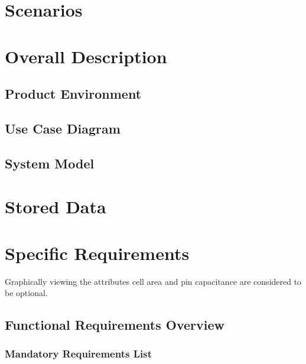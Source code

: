 \documentclass[10pt,a4paper]{report}
\begin{document}
\chapter{Scenarios}

\chapter{Overall Description}
\section{Product Environment}
\section{Use Case Diagram}
\section{System Model}

\chapter{Stored Data}

\chapter{Specific Requirements}
Graphically viewing the attributes cell area and pin capacitance are considered to be optional.
\section{Functional Requirements Overview}
\subsection{Mandatory Requirements List}
\end{document}
